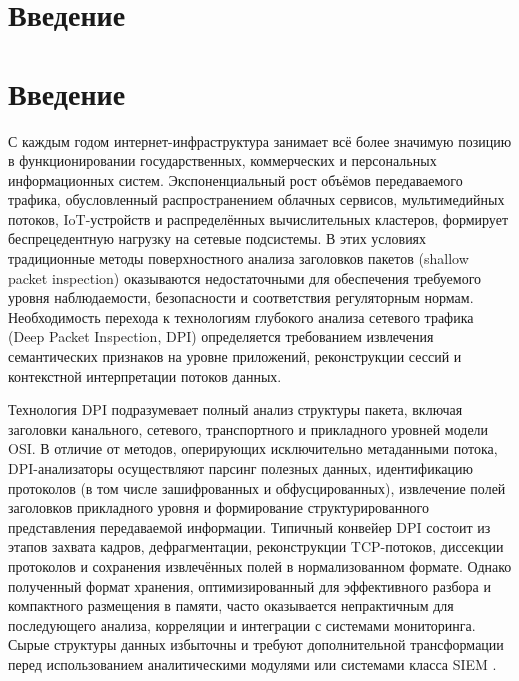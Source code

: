 \section{Введение}
\label{sec:Section0} 

\section*{Введение}
С каждым годом интернет-инфраструктура занимает всё более значимую позицию в функционировании государственных, коммерческих и персональных информационных систем.
Экспоненциальный рост объёмов передаваемого трафика, обусловленный распространением облачных сервисов, мультимедийных потоков, IoT-устройств и распределённых вычислительных кластеров, формирует беспрецедентную нагрузку на сетевые подсистемы.
В этих условиях традиционные методы поверхностного анализа заголовков пакетов (shallow packet inspection) оказываются недостаточными для обеспечения требуемого уровня наблюдаемости, безопасности и соответствия регуляторным нормам.
Необходимость перехода к технологиям глубокого анализа сетевого трафика (Deep Packet Inspection, DPI) \cite{celebi2023comprehensive} определяется требованием извлечения семантических признаков на уровне приложений, реконструкции сессий и контекстной интерпретации потоков данных.

Технология DPI подразумевает полный анализ структуры пакета, включая заголовки канального, сетевого, транспортного и прикладного уровней модели OSI.
В отличие от методов, оперирующих исключительно метаданными потока, DPI-анализаторы осуществляют парсинг полезных данных, идентификацию протоколов (в том числе зашифрованных и обфусцированных), извлечение полей заголовков прикладного уровня и формирование структурированного представления передаваемой информации.
Типичный конвейер DPI состоит из этапов захвата кадров, дефрагментации, реконструкции TCP-потоков, диссекции протоколов и сохранения извлечённых полей в нормализованном формате.
Однако полученный формат хранения, оптимизированный для эффективного разбора и компактного размещения в памяти, часто оказывается непрактичным для последующего анализа, корреляции и интеграции с системами мониторинга.
Сырые структуры данных избыточны и требуют дополнительной трансформации перед использованием аналитическими модулями или системами класса SIEM \cite{siem}.

